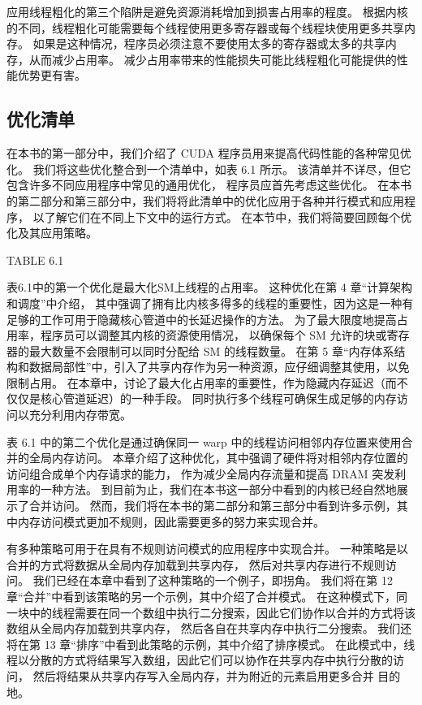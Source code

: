 应用线程粗化的第三个陷阱是避免资源消耗增加到损害占用率的程度。 
根据内核的不同，线程粗化可能需要每个线程使用更多寄存器或每个线程块使用更多共享内存。 
如果是这种情况，程序员必须注意不要使用太多的寄存器或太多的共享内存，从而减少占用率。 
减少占用率带来的性能损失可能比线程粗化可能提供的性能优势更有害。

\subsection{优化清单}
在本书的第一部分中，我们介绍了 CUDA 程序员用来提高代码性能的各种常见优化。 
我们将这些优化整合到一个清单中，如表 6.1 所示。 该清单并不详尽，但它包含许多不同应用程序中常见的通用优化，
程序员应首先考虑这些优化。 在本书的第二部分和第三部分中，我们将将此清单中的优化应用于各种并行模式和应用程序，
以了解它们在不同上下文中的运行方式。 在本节中，我们将简要回顾每个优化及其应用策略。

{\color{red} TABLE 6.1}

表6.1中的第一个优化是最大化SM上线程的占用率。 这种优化在第 4 章“计算架构和调度”中介绍，
其中强调了拥有比内核多得多的线程的重要性，因为这是一种有足够的工作可用于隐藏核心管道中的长延迟操作的方法。 
为了最大限度地提高占用率，程序员可以调整其内核的资源使用情况，
以确保每个 SM 允许的块或寄存器的最大数量不会限制可以同时分配给 SM 的线程数量。 
在第 5 章“内存体系结构和数据局部性”中，引入了共享内存作为另一种资源，应仔细调整其使用，以免限制占用。 
在本章中，讨论了最大化占用率的重要性，作为隐藏内存延迟（而不仅仅是核心管道延迟）的一种手段。 
同时执行多个线程可确保生成足够的内存访问以充分利用内存带宽。

表 6.1 中的第二个优化是通过确保同一 warp 中的线程访问相邻内存位置来使用合并的全局内存访问。 
本章介绍了这种优化，其中强调了硬件将对相邻内存位置的访问组合成单个内存请求的能力，
作为减少全局内存流量和提高 DRAM 突发利用率的一种方法。 
到目前为止，我们在本书这一部分中看到的内核已经自然地展示了合并访问。 
然而，我们将在本书的第二部分和第三部分中看到许多示例，其中内存访问模式更加不规则，因此需要更多的努力来实现合并。

有多种策略可用于在具有不规则访问模式的应用程序中实现合并。 一种策略是以合并的方式将数据从全局内存加载到共享内存，
然后对共享内存进行不规则访问。 我们已经在本章中看到了这种策略的一个例子，即拐角。 
我们将在第 12 章“合并”中看到该策略的另一个示例，其中介绍了合并模式。 
在这种模式下，同一块中的线程需要在同一个数组中执行二分搜索，因此它们协作以合并的方式将该数组从全局内存加载到共享内存，
然后各自在共享内存中执行二分搜索。 我们还将在第 13 章“排序”中看到此策略的示例，其中介绍了排序模式。 
在此模式中，线程以分散的方式将结果写入数组，因此它们可以协作在共享内存中执行分散的访问，
然后将结果从共享内存写入全局内存，并为附近的元素启用更多合并 目的地。

